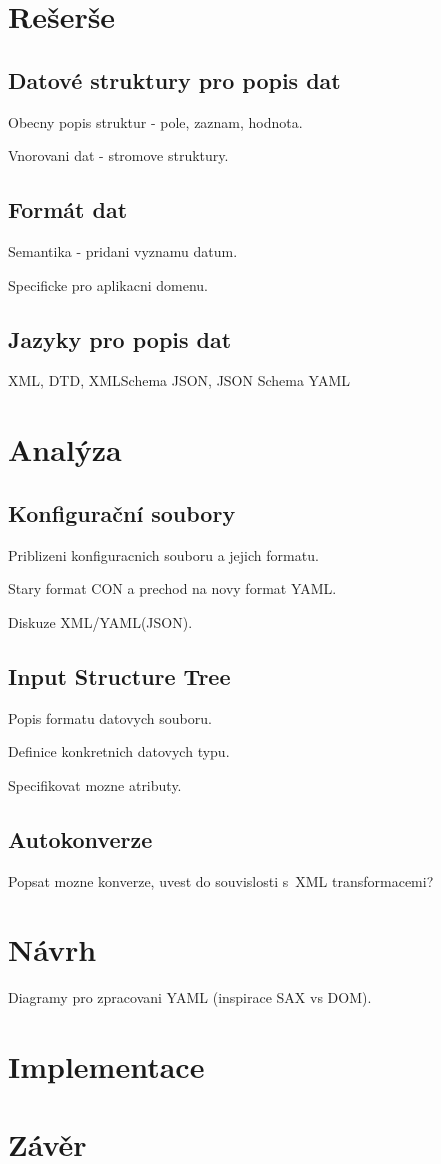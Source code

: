 \documentclass[FM,DP]{tulthesis}
\begin{document}


\chapter{Rešerše}

\section{Datové struktury pro popis dat}
Obecny popis struktur - pole, zaznam, hodnota.


Vnorovani dat - stromove struktury.


\section{Formát dat}
Semantika - pridani vyznamu datum.

Specificke pro aplikacni domenu.

\section{Jazyky pro popis dat}
XML, DTD, XMLSchema
JSON, JSON Schema
YAML


\chapter{Analýza}


\section{Konfigurační soubory}
Priblizeni konfiguracnich souboru a jejich formatu.

Stary format CON a prechod na novy format YAML.

Diskuze XML/YAML(JSON). 

\section{Input Structure Tree}
Popis formatu datovych souboru.

Definice konkretnich datovych typu.

Specifikovat mozne atributy.

\section{Autokonverze}
Popsat mozne konverze, uvest do souvislosti s~XML transformacemi?


\chapter{Návrh}
Diagramy pro zpracovani YAML (inspirace SAX vs DOM).




\chapter{Implementace}


\chapter*{Závěr}
\end{document}
